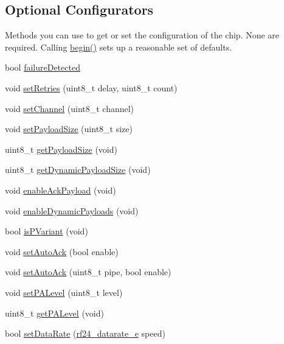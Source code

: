 \subsection*{Optional Configurators}
\label{_amgrpe1a83b99ec8153e5baf680edeeed1586}%
 Methods you can use to get or set the configuration of the chip. None are required. Calling \hyperlink{class_r_f24_a9e720d303ad594de611a813c69244517}{begin()} sets up a reasonable set of defaults. \begin{DoxyCompactItemize}
\item 
bool \hyperlink{class_r_f24_a2e40fe66d1231a333aa2534e8491f828}{failure\+Detected}
\item 
void \hyperlink{class_r_f24_a4c6d3959c8320e64568395f4ef507aef}{set\+Retries} (uint8\+\_\+t delay, uint8\+\_\+t count)
\item 
void \hyperlink{class_r_f24_a5e6e5a5f6c85d2638381cab2c0f3702e}{set\+Channel} (uint8\+\_\+t channel)
\item 
void \hyperlink{class_r_f24_a343e5d23477181011dea030fafb1954f}{set\+Payload\+Size} (uint8\+\_\+t size)
\item 
uint8\+\_\+t \hyperlink{class_r_f24_a0aa0c7cbe3d38fef4722f3f1d2d6c5f1}{get\+Payload\+Size} (void)
\item 
uint8\+\_\+t \hyperlink{class_r_f24_a65963ed8d8fd45f847e2f673995b85e1}{get\+Dynamic\+Payload\+Size} (void)
\item 
void \hyperlink{class_r_f24_abf8efced2ee9edbcc6510878b20edc1b}{enable\+Ack\+Payload} (void)
\item 
void \hyperlink{class_r_f24_a443888504975d7441d6452a09d09a8fa}{enable\+Dynamic\+Payloads} (void)
\item 
bool \hyperlink{class_r_f24_a62846750b82682beb7593719eb60ed60}{is\+P\+Variant} (void)
\item 
void \hyperlink{class_r_f24_aec71746d59da978bcbb975167886a2cc}{set\+Auto\+Ack} (bool enable)
\item 
void \hyperlink{class_r_f24_a60dba9e558f3620ab489af68ea3dea9c}{set\+Auto\+Ack} (uint8\+\_\+t pipe, bool enable)
\item 
void \hyperlink{class_r_f24_adedac579590a668ae97baccab284de8a}{set\+P\+A\+Level} (uint8\+\_\+t level)
\item 
uint8\+\_\+t \hyperlink{class_r_f24_af7c4dcd84466168c5816382ceb366067}{get\+P\+A\+Level} (void)
\item 
bool \hyperlink{class_r_f24_aeb9920e7a95699748b003c4a839b0814}{set\+Data\+Rate} (\hyperlink{_r_f24_8h_a82745de4aa1251b7561564b3ed1d6522}{rf24\+\_\+datarate\+\_\+e} speed)

\end{DoxyCompactItemize}
